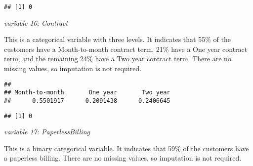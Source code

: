 \documentclass[
  a4paper]{article}
\newenvironment{Shaded}{\begin{snugshade}}{\end{snugshade}}
\newcommand{\CommentTok}[1]{\textcolor[rgb]{0.56,0.35,0.01}{\textit{#1}}}
\newcommand{\FunctionTok}[1]{\textcolor[rgb]{0.13,0.29,0.53}{\textbf{#1}}}
\newcommand{\NormalTok}[1]{#1}
\newcommand{\SpecialCharTok}[1]{\textcolor[rgb]{0.81,0.36,0.00}{\textbf{#1}}}
\begin{document}
\begin{Shaded}
\end{Shaded}

\begin{verbatim}
## [1] 0
\end{verbatim}

\emph{variable 16: Contract}

This is a categorical variable with three levels. It indicates that 55\%
of the customers have a Month-to-month contract term, 21\% have a One
year contract term, and the remaining 24\% have a Two year contract
term. There are no missing values, so imputation is not required.

\begin{Shaded}
\end{Shaded}

\begin{verbatim}
## 
## Month-to-month       One year       Two year 
##      0.5501917      0.2091438      0.2406645
\end{verbatim}

\begin{Shaded}
\end{Shaded}

\begin{verbatim}
## [1] 0
\end{verbatim}

\emph{variable 17: PaperlessBilling}

This is a binary categorical variable. It indicates that 59\% of the
customers have a paperless billing. There are no missing values, so
imputation is not required.

\begin{Shaded}
\end{Shaded}
\end{document}
